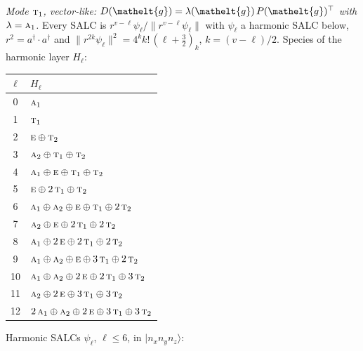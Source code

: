 \documentclass[11pt]{article}
\newcommand{\eltfont}[1]{{\let\sigma\eltsigma\mathelt{#1}}}
\newcommand{\irr}[1]{\text{\normalfont\scshape #1}}
\newcommand{\elt}[1]{\eltfont{#1}}
\newcommand{\occ}[1]{\lvert #1\rangle}
\newcommand{\gel}{\elt{g}}             %
\newcommand{\gmat}{P(\gel)^{\top}}     %
\begin{document}
\emph{Mode $\irr{t}_{1}$, vector-like: $D(\gel)=\lambda(\gel)\,\gmat$ with $\lambda=\irr{a}_{1}$.} Every SALC is $r^{v-\ell}\psi_\ell/\lVert r^{v-\ell}\psi_\ell\rVert$ with $\psi_\ell$ a harmonic SALC below, $r^2=a^\dagger\!\cdot a^\dagger$ and $\lVert r^{2k}\psi_\ell\rVert^2=4^kk!\,(\ell+\tfrac32)_k$, $k=(v-\ell)/2$. Species of the harmonic layer $H_\ell$:
\begin{longtable}{c l}\hline $\ell$ & $H_\ell$\\ \hline\endhead
0 & $\irr{a}_{1}$\\
1 & $\irr{t}_{1}$\\
2 & $\irr{e}\oplus \irr{t}_{2}$\\
3 & $\irr{a}_{2}\oplus \irr{t}_{1}\oplus \irr{t}_{2}$\\
4 & $\irr{a}_{1}\oplus \irr{e}\oplus \irr{t}_{1}\oplus \irr{t}_{2}$\\
5 & $\irr{e}\oplus 2\,\irr{t}_{1}\oplus \irr{t}_{2}$\\
6 & $\irr{a}_{1}\oplus \irr{a}_{2}\oplus \irr{e}\oplus \irr{t}_{1}\oplus 2\,\irr{t}_{2}$\\
7 & $\irr{a}_{2}\oplus \irr{e}\oplus 2\,\irr{t}_{1}\oplus 2\,\irr{t}_{2}$\\
8 & $\irr{a}_{1}\oplus 2\,\irr{e}\oplus 2\,\irr{t}_{1}\oplus 2\,\irr{t}_{2}$\\
9 & $\irr{a}_{1}\oplus \irr{a}_{2}\oplus \irr{e}\oplus 3\,\irr{t}_{1}\oplus 2\,\irr{t}_{2}$\\
10 & $\irr{a}_{1}\oplus \irr{a}_{2}\oplus 2\,\irr{e}\oplus 2\,\irr{t}_{1}\oplus 3\,\irr{t}_{2}$\\
11 & $\irr{a}_{2}\oplus 2\,\irr{e}\oplus 3\,\irr{t}_{1}\oplus 3\,\irr{t}_{2}$\\
12 & $2\,\irr{a}_{1}\oplus \irr{a}_{2}\oplus 2\,\irr{e}\oplus 3\,\irr{t}_{1}\oplus 3\,\irr{t}_{2}$\\
\hline\end{longtable}
Harmonic SALCs $\psi_\ell$, $\ell\le6$, in $\occ{n_xn_yn_z}$:
\end{document}
